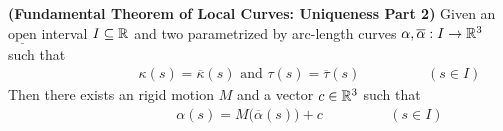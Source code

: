 \documentclass{report}
\begin{document}
\begin{theorem}
\label{FTLCU}
\textbf{(Fundamental Theorem of Local Curves: Uniqueness Part 2)} Given an $\underline{\text{open}}$ interval $I \subseteq \mathbb{R}$ and two parametrized by arc-length curves $\alpha ,\overline{\alpha }:I\rightarrow \mathbb{R}^3$ such that 
\begin{align*}
\hspace{3cm}\kappa(s)=\overline{\kappa}(s)\text{ and }\tau(s)=\overline{\tau}(s)\hspace{2cm}(s \in I)
\end{align*}
Then there exists an rigid motion $M$ and a vector  $c \in\mathbb{R}^3$ such that 
\begin{align*}
\hspace{3cm}\alpha (s)=M\big(\overline{\alpha }(s) \big)+c\hspace{2cm}(s \in I)
\end{align*}
\end{theorem} 
\end{document}
